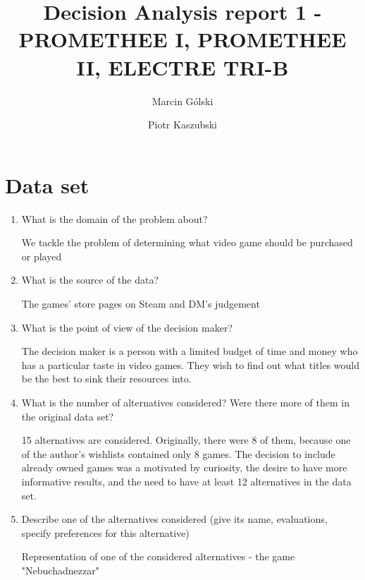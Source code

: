\documentclass{article}
\author{Marcin Gólski \and Piotr Kaszubski}
\title{Decision Analysis report 1 - PROMETHEE I, PROMETHEE II, ELECTRE TRI-B}
\begin{document}
\maketitle

\section{Data set}

\begin{enumerate}

    \item What is the domain of the problem about?

    We tackle the problem of determining what video game should be purchased or played

    \item What is the source of the data?

    The games' store pages on Steam and DM's judgement

    \item What is the point of view of the decision maker?

    The decision maker is a person with a limited budget of time and money who has a particular taste in video games. They wish to find out what titles would be the best to sink their resources into.

    \item What is the number of alternatives considered? Were there more of them in the original data set?

    15 alternatives are considered. Originally, there were 8 of them, because one of the author's wishlists contained only 8 games. The decision to include already owned games was a motivated by curiosity, the desire to have more informative results, and the need to have at least 12 alternatives in the data set.

    \item Describe one of the alternatives considered (give its name, evaluations, specify preferences for this alternative)

    Representation of one of the considered alternatives - the game "Nebuchadnezzar"


\end{enumerate}
\end{document}
